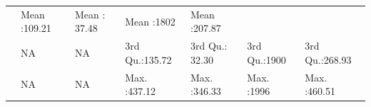 \documentclass[]{article}
\begin{document}
\begin{longtable}[]{@{}lllllll@{}}
\begin{minipage}[t]{0.14\columnwidth}
\end{minipage} & \begin{minipage}[t]{0.13\columnwidth}\raggedright\strut
Mean :109.21\strut
\end{minipage} & \begin{minipage}[t]{0.13\columnwidth}\raggedright\strut
Mean : 37.48\strut
\end{minipage} & \begin{minipage}[t]{0.11\columnwidth}\raggedright\strut
Mean :1802\strut
\end{minipage} & \begin{minipage}[t]{0.13\columnwidth}\raggedright\strut
Mean :207.87\strut
\end{minipage}\tabularnewline
\begin{minipage}[t]{0.03\columnwidth}\raggedright\strut
\strut
\end{minipage} & \begin{minipage}[t]{0.14\columnwidth}\raggedright\strut
NA\strut
\end{minipage} & \begin{minipage}[t]{0.14\columnwidth}\raggedright\strut
NA\strut
\end{minipage} & \begin{minipage}[t]{0.13\columnwidth}\raggedright\strut
3rd Qu.:135.72\strut
\end{minipage} & \begin{minipage}[t]{0.13\columnwidth}\raggedright\strut
3rd Qu.: 32.30\strut
\end{minipage} & \begin{minipage}[t]{0.11\columnwidth}\raggedright\strut
3rd Qu.:1900\strut
\end{minipage} & \begin{minipage}[t]{0.13\columnwidth}\raggedright\strut
3rd Qu.:268.93\strut
\end{minipage}\tabularnewline
\begin{minipage}[t]{0.03\columnwidth}\raggedright\strut
\strut
\end{minipage} & \begin{minipage}[t]{0.14\columnwidth}\raggedright\strut
NA\strut
\end{minipage} & \begin{minipage}[t]{0.14\columnwidth}\raggedright\strut
NA\strut
\end{minipage} & \begin{minipage}[t]{0.13\columnwidth}\raggedright\strut
Max. :437.12\strut
\end{minipage} & \begin{minipage}[t]{0.13\columnwidth}\raggedright\strut
Max. :346.33\strut
\end{minipage} & \begin{minipage}[t]{0.11\columnwidth}\raggedright\strut
Max. :1996\strut
\end{minipage} & \begin{minipage}[t]{0.13\columnwidth}\raggedright\strut
Max. :460.51\strut
\end{minipage}\tabularnewline
\bottomrule
\end{longtable}
\end{document}
